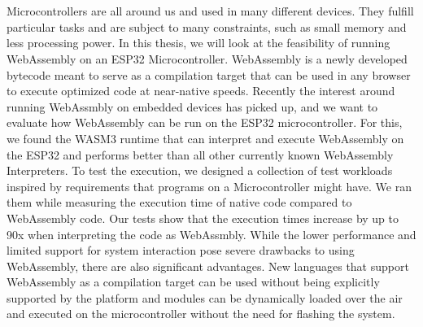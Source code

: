 \chapter{\abstractname}

Microcontrollers are all around us and used in many different devices. They fulfill particular tasks and are subject to many constraints, such as small memory and less processing power. In this thesis, we will look at the feasibility of running WebAssembly on an ESP32 Microcontroller. WebAssembly is a newly developed bytecode meant to serve as a compilation target that can be used in any browser to execute optimized code at near-native speeds. Recently the interest around running WebAssmbly on embedded devices has picked up, and we want to evaluate how WebAssembly can be run on the ESP32 microcontroller. For this, we found the WASM3 runtime that can interpret and execute WebAssembly on the ESP32 and performs better than all other currently known WebAssembly Interpreters. To test the execution, we designed a collection of test workloads inspired by requirements that programs on a Microcontroller might have. We ran them while measuring the execution time of native code compared to WebAssembly code. Our tests show that the execution times increase by up to 90x when interpreting the code as WebAssmbly. While the lower performance and limited support for system interaction pose severe drawbacks to using WebAssembly, there are also significant advantages. New languages that support WebAssembly as a compilation target can be used without being explicitly supported by the platform and modules can be dynamically loaded over the air and executed on the microcontroller without the need for flashing the system.
